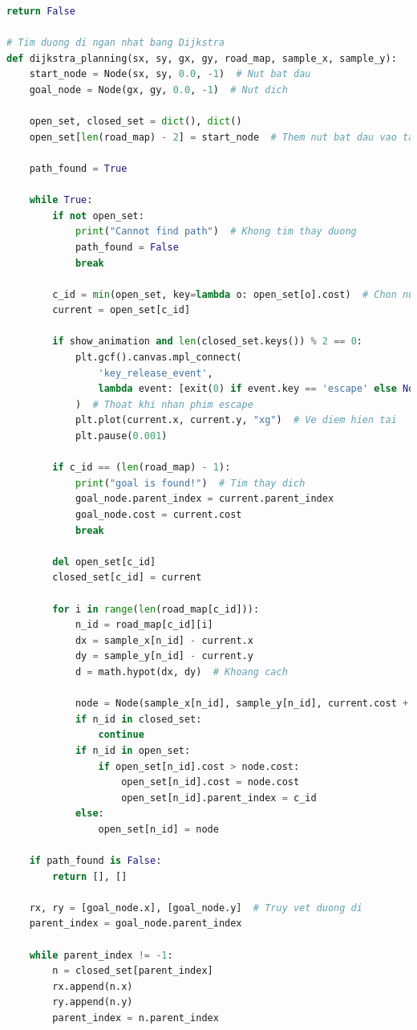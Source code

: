 \documentclass[12pt,a4paper,openany,oneside]{report}
\begin{document}
\begin{lstlisting}[language=Python, caption=Cài đặt thuật toán PRM bằng Python]
    return False

# Tim duong di ngan nhat bang Dijkstra
def dijkstra_planning(sx, sy, gx, gy, road_map, sample_x, sample_y):
    start_node = Node(sx, sy, 0.0, -1)  # Nut bat dau
    goal_node = Node(gx, gy, 0.0, -1)  # Nut dich

    open_set, closed_set = dict(), dict()
    open_set[len(road_map) - 2] = start_node  # Them nut bat dau vao tap mo

    path_found = True

    while True:
        if not open_set:
            print("Cannot find path")  # Khong tim thay duong
            path_found = False
            break

        c_id = min(open_set, key=lambda o: open_set[o].cost)  # Chon nut chi phi nho nhat
        current = open_set[c_id]

        if show_animation and len(closed_set.keys()) % 2 == 0:
            plt.gcf().canvas.mpl_connect(
                'key_release_event',
                lambda event: [exit(0) if event.key == 'escape' else None]
            )  # Thoat khi nhan phim escape
            plt.plot(current.x, current.y, "xg")  # Ve diem hien tai
            plt.pause(0.001)

        if c_id == (len(road_map) - 1):
            print("goal is found!")  # Tim thay dich
            goal_node.parent_index = current.parent_index
            goal_node.cost = current.cost
            break

        del open_set[c_id]
        closed_set[c_id] = current

        for i in range(len(road_map[c_id])):
            n_id = road_map[c_id][i]
            dx = sample_x[n_id] - current.x
            dy = sample_y[n_id] - current.y
            d = math.hypot(dx, dy)  # Khoang cach

            node = Node(sample_x[n_id], sample_y[n_id], current.cost + d, c_id)  # Tao nut moi
            if n_id in closed_set:
                continue
            if n_id in open_set:
                if open_set[n_id].cost > node.cost:
                    open_set[n_id].cost = node.cost
                    open_set[n_id].parent_index = c_id
            else:
                open_set[n_id] = node

    if path_found is False:
        return [], []

    rx, ry = [goal_node.x], [goal_node.y]  # Truy vet duong di
    parent_index = goal_node.parent_index

    while parent_index != -1:
        n = closed_set[parent_index]
        rx.append(n.x)
        ry.append(n.y)
        parent_index = n.parent_index


\end{lstlisting}
\end{document}
